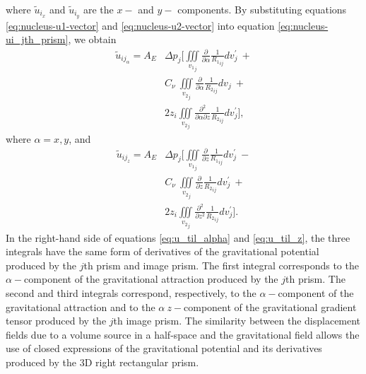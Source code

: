 \documentclass[P]{BrJG_submit}
\begin{document}
where ${\tilde{u}}_{{i}_x}$ and ${\tilde{u}}_{{i}_y}$ are the $x-$ and $y-$ components.
By substituting equations \ref{eq:nucleus-u1-vector} and \ref{eq:nucleus-u2-vector} 
into equation \ref{eq:nucleus-ui_jth_prism}, we obtain
\begin{equation}
\begin{aligned}
{\tilde{u}}_{{ij}_\alpha} = 
 A_{E} 
 &  \Delta p_{j}  
 \bigg[ \iiint\limits_{{v_{1}}_{j}} 
\frac{\partial }{\partial \alpha} {\frac{1}{{R_1}_{ij}}}  dv_{j}^{\prime} \: + \\ 
& C_{\nu} \: \iiint\limits_{{v_{2}}_{j}}
\frac{\partial }{\partial \alpha} {\frac{1}{{R_2}_{ij}}}  dv_j \: + \\ 
& 2  z_{i}  \iiint\limits_{{v_{2}}_{j}}
\frac{\partial^{2}  }{\partial \alpha \partial z} {\frac{1}{{R_2}_{ij}}} dv_{j}^{\prime} \bigg], 
\end{aligned}
\label{eq:u_til_alpha}
\end{equation}
where $\alpha = x, y$, and
\begin{equation}
\begin{aligned}
{\tilde{u}}_{{ij}_z} = 
A_{E} 
& \Delta p_{j}  \bigg[ \iiint\limits_{{v_{1}}_{j}}
\frac{\partial }{\partial z} {\frac{1}{{R_1}_{ij}}} dv_{j}^{\prime} \: - \\
& C_{\nu}  \: \iiint\limits_{{v_{2}}_{j}}
\frac{\partial }{\partial z} {\frac{1}{{R_2}_{ij}}} dv_{j}^{\prime} \: + \\ 
& 2 z_{i}  \iiint\limits_{{v_{2}}_{j}}
\frac{\partial^{2}  }{\partial z^{2}} {\frac{1}{{R_2}_{ij}}}  dv_{j}^{\prime} \bigg] .
\end{aligned}
\label{eq:u_til_z}
\end{equation}
In the right-hand side of equations \ref{eq:u_til_alpha} and \ref{eq:u_til_z}, the three integrals have the same form of derivatives of the gravitational potential produced by the $j$th prism and image prism. 
The first integral corresponds to the $\alpha-$component of the gravitational attraction 
produced by the $j$th prism.
The second and third integrals correspond, respectively, to the $\alpha-$component of the gravitational attraction and to the $\alpha \:z-$component of the gravitational 
gradient tensor produced by the $j$th image prism. 
The similarity between the displacement fields due to a volume source in a half-space and the gravitational field allows the use of closed expressions of the gravitational potential and its derivatives produced by the 3D right rectangular prism.  
\end{document}
